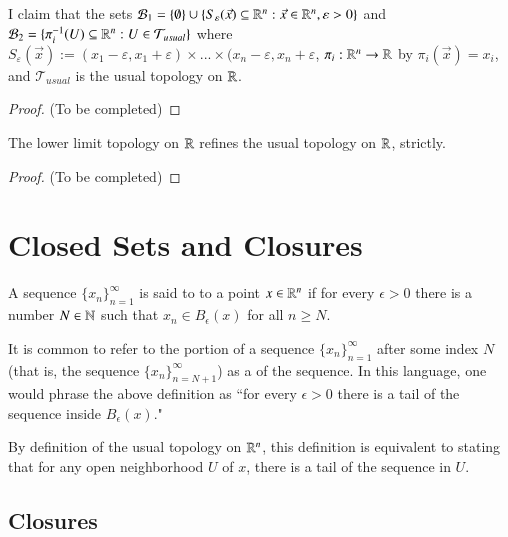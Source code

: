 \documentclass[12pt, a4paper, oneside, openright, titlepage]{book}
\begin{document}
\begin{exercise}
    I claim that the sets $\mathcal{B}_1 =  \{\emptyset\}\cup\{S_{\varepsilon}(\vec{x}) \subseteq \mathbb R^n:\vec{x} \in \mathbb R^n, \varepsilon >0\}$ and $\mathcal{B}_2 = \{\pi_i^{-1}(U) \subseteq \mathbb R^n:U \in \mathcal{T}_{usual}\}$ where $S_{\varepsilon}(\vec{x}) := (x_1-\varepsilon,x_1+\varepsilon)\times ... \times(x_n-\varepsilon,x_n+\varepsilon$, $\pi_i:\mathbb R^n\rightarrow \mathbb R$ by $\pi_i(\vec{x}) = x_i$, and $\mathcal{T}_{usual}$ is the usual topology on $\mathbb R$.
\end{exercise}
\begin{proof}
    (To be completed)
\end{proof}


\begin{exercise}
    The lower limit topology on $\mathbb R$ refines the usual topology on $\mathbb R$, strictly.
\end{exercise}
\begin{proof}
    (To be completed)
\end{proof}




\section{Closed Sets and Closures}


\begin{definition}
    A sequence $\{x_n\}_{n=1}^{\infty}$ is said to  to a point $x \in \mathbb R^n$ if for every $\epsilon > 0$ there is a number $N \in \mathbb N$ such that $x_n \in B_{\epsilon}(x)$ for all $n \geq N$.
\end{definition}

\begin{remark}
    It is common to refer to the portion of a sequence $\{x_n\}_{n=1}^{\infty}$ after some index $N$ (that is, the sequence $\{x_n\}_{n=N+1}^{\infty}$) as a  of the sequence. In this language, one would phrase the above definition as ``for every $\epsilon > 0$ there is a tail of the sequence inside $B_{\epsilon}(x)$."
\end{remark}

\begin{remark}
    By definition of the usual topology on $\mathbb R^n$, this definition is equivalent to stating that for any open neighborhood $U$ of $x$, there is a tail of the sequence in $U$.
\end{remark}


\subsection{Closures}
\end{document}
